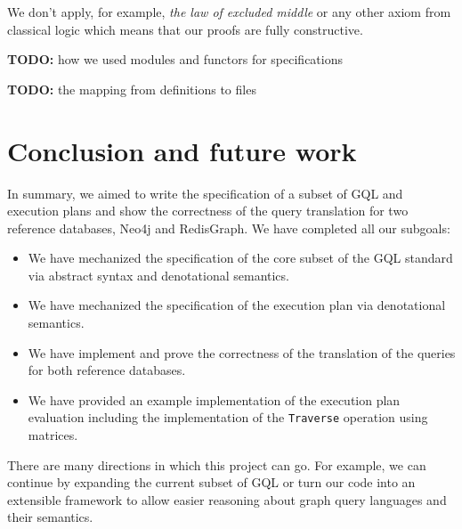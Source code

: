 \documentclass[14pt]{constructor-thesis}
\theoremstyle{definition}
\newcommand{\todo}[1]{
  \begin{tcolorbox}[colframe=red!75!black,colback=red!5!white,arc=0pt,fonttitle=\bfseries]
  \textbf{TODO:} #1
  \end{tcolorbox}
}
\begin{document}
We don't apply, for example, \textit{the law of excluded middle} or any other axiom from classical logic which means that our proofs are fully constructive.

\todo{how we used modules and functors for specifications}
\todo{the mapping from definitions to files}

\section*{Conclusion and future work}

In summary, we aimed to write the specification of a subset of GQL and execution plans and show the correctness of the query translation for two reference databases, Neo4j and RedisGraph. We have completed all our subgoals:

\begin{itemize}
  \item We have mechanized the specification of the core subset of the GQL standard via abstract syntax and denotational semantics.
  \item We have mechanized the specification of the execution plan via denotational semantics.
  \item We have implement and prove the correctness of the translation of the queries for both reference databases.
  \item We have provided an example implementation of the execution plan evaluation including the implementation of the \texttt{Traverse} operation using matrices.
\end{itemize}

There are many directions in which this project can go. For example, we can continue by expanding the current subset of GQL or turn our code into an extensible framework to allow easier reasoning about graph query languages and their semantics.

\setmonofont[Mapping=tex-text]{CMU Typewriter Text}
% 
% 
\printbibliography
\end{document}
